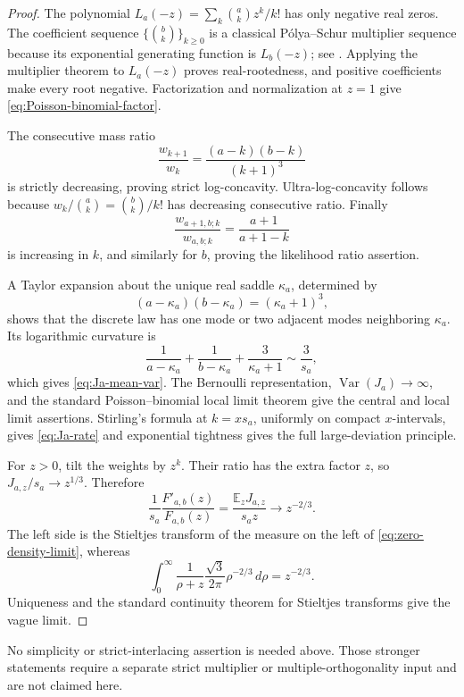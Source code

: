 \documentclass[11pt]{article}
\theoremstyle{definition}
\theoremstyle{remark}
\newcommand{\Var}{\operatorname{Var}}
\begin{document}
\begin{proof}
The polynomial \(L_a(-z)=\sum_k\binom akz^k/k!\) has only negative real
zeros.  The coefficient sequence \(\{\binom bk\}_{k\ge0}\) is a classical
P\'olya--Schur multiplier sequence because its exponential generating
function is \(L_b(-z)\); see \cite{PolyaSchur1914}.  Applying the multiplier
theorem to \(L_a(-z)\)
proves real-rootedness, and positive coefficients make every root negative.
Factorization and normalization at \(z=1\) give
\eqref{eq:Poisson-binomial-factor}.

The consecutive mass ratio
\[
 \frac{w_{k+1}}{w_k}=\frac{(a-k)(b-k)}{(k+1)^3}
\]
is strictly decreasing, proving strict log-concavity.  Ultra-log-concavity
follows because \(w_k/\binom ak=\binom bk/k!\) has decreasing consecutive
ratio.  Finally
\[
 \frac{w_{a+1,b;k}}{w_{a,b;k}}=\frac{a+1}{a+1-k}
\]
is increasing in \(k\), and similarly for \(b\), proving the likelihood
ratio assertion.

A Taylor expansion about the unique real saddle
\(\kappa_a\), determined by
\[
 (a-\kappa_a)(b-\kappa_a)=(\kappa_a+1)^3,
\]
shows that the discrete law has one mode or two adjacent modes neighboring
\(\kappa_a\).  Its logarithmic curvature is
\[
 \frac1{a-\kappa_a}+\frac1{b-\kappa_a}
 +\frac3{\kappa_a+1}\sim\frac3{s_a},
\]
which gives \eqref{eq:Ja-mean-var}.  The Bernoulli representation,
\(\Var(J_a)\to\infty\), and the standard Poisson--binomial local limit
theorem \cite[Chapter~VII]{Petrov1975} give the central and local limit
assertions.  Stirling's
formula at \(k=xs_a\), uniformly on compact \(x\)-intervals, gives
\eqref{eq:Ja-rate} and exponential tightness gives the full large-deviation
principle.

For \(z>0\), tilt the weights by \(z^k\).  Their ratio has the extra factor
\(z\), so \(J_{a,z}/s_a\to z^{1/3}\).  Therefore
\begin{equation}\label{eq:Stieltjes-transform-limit}
 \frac1{s_a}\frac{F'_{a,b}(z)}{F_{a,b}(z)}
 =\frac{\mathbb E_zJ_{a,z}}{s_az}\longrightarrow z^{-2/3}.
\end{equation}
The left side is the Stieltjes transform of the measure on the left of
\eqref{eq:zero-density-limit}, whereas
\[
 \int_0^\infty\frac1{\rho+z}
 \frac{\sqrt3}{2\pi}\rho^{-2/3}\,d\rho=z^{-2/3}.
\]
Uniqueness and the standard continuity theorem for Stieltjes transforms
\cite[Chapter~I]{Akhiezer1965} give the vague limit.
\end{proof}

No simplicity or strict-interlacing assertion is needed above.  Those
stronger statements require a separate strict multiplier or
multiple-orthogonality input and are not claimed here.
\end{document}
